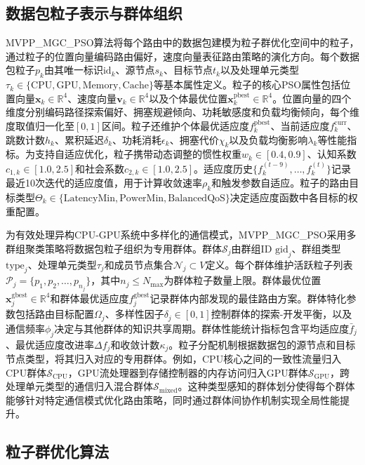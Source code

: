 \documentclass[11pt,a4paper]{article}
\begin{document}
\subsection{数据包粒子表示与群体组织}

MVPP\_MGC\_PSO算法将每个路由中的数据包建模为粒子群优化空间中的粒子，通过粒子的位置向量编码路由偏好，速度向量表征路由策略的演化方向。每个数据包粒子$p_k$由其唯一标识$\text{id}_k$、源节点$s_k$、目标节点$t_k$以及处理单元类型$\tau_k \in \{\text{CPU}, \text{GPU}, \text{Memory}, \text{Cache}\}$等基本属性定义。粒子的核心PSO属性包括位置向量$\mathbf{x}_k \in \mathbb{R}^4$、速度向量$\mathbf{v}_k \in \mathbb{R}^4$以及个体最优位置$\mathbf{x}_k^{\text{pbest}} \in \mathbb{R}^4$。位置向量的四个维度分别编码路径探索偏好、拥塞规避倾向、功耗敏感度和负载均衡倾向，每个维度取值归一化至$[0, 1]$区间。粒子还维护个体最优适应度$f_k^{\text{pbest}}$、当前适应度$f_k^{\text{curr}}$、跳数计数$h_k$、累积延迟$\delta_k$、功耗消耗$\epsilon_k$、拥塞代价$\chi_k$以及负载均衡影响$\lambda_k$等性能指标。为支持自适应优化，粒子携带动态调整的惯性权重$w_k \in [0.4, 0.9]$、认知系数$c_{1,k} \in [1.0, 2.5]$和社会系数$c_{2,k} \in [1.0, 2.5]$。适应度历史$\{f_k^{(t-9)}, \ldots, f_k^{(t)}\}$记录最近10次迭代的适应度值，用于计算收敛速率$\rho_k$和触发参数自适应。粒子的路由目标类型$\Theta_k \in \{\text{LatencyMin}, \text{PowerMin}, \text{BalancedQoS}\}$决定适应度函数中各目标的权重配置。

为有效处理异构CPU-GPU系统中多样化的通信模式，MVPP\_MGC\_PSO采用多群组聚类策略将数据包粒子组织为专用群体。群体$\mathcal{S}_j$由群组ID $\text{gid}_j$、群组类型$\text{type}_j$、处理单元类型$\tau_j$和成员节点集合$\mathcal{N}_j \subset V$定义。每个群体维护活跃粒子列表$\mathcal{P}_j = \{p_1, p_2, \ldots, p_{n_j}\}$，其中$n_j \leq N_{\max}$为群体粒子数量上限。群体最优位置$\mathbf{x}_j^{\text{gbest}} \in \mathbb{R}^4$和群体最优适应度$f_j^{\text{gbest}}$记录群体内部发现的最佳路由方案。群体特化参数包括路由目标配置$\Omega_j$、多样性因子$\delta_j \in [0, 1]$控制群体的探索-开发平衡，以及通信频率$\phi_j$决定与其他群体的知识共享周期。群体性能统计指标包含平均适应度$\bar{f}_j$、最优适应度改进率$\Delta f_j$和收敛计数$\kappa_j$。粒子分配机制根据数据包的源节点和目标节点类型，将其归入对应的专用群体。例如，CPU核心之间的一致性流量归入CPU群体$\mathcal{S}_{\text{CPU}}$，GPU流处理器到存储控制器的内存访问归入GPU群体$\mathcal{S}_{\text{GPU}}$，跨处理单元类型的通信归入混合群体$\mathcal{S}_{\text{mixed}}$。这种类型感知的群体划分使得每个群体能够针对特定通信模式优化路由策略，同时通过群体间协作机制实现全局性能提升。

\subsection{粒子群优化算法}
\end{document}
